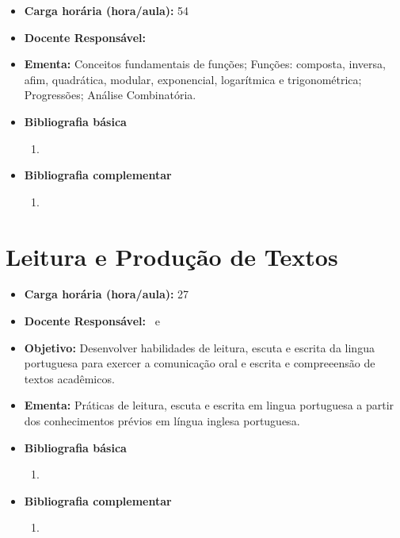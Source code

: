 \documentclass[11pt,fleqn]{book} %
\begin{document}
\begin{itemize}
	\item \textbf{Carga horária (hora/aula):} 54
	\item \textbf{Docente Responsável:}~
	\item \textbf{Ementa:} 
	Conceitos fundamentais de funções;
	Funções: composta, inversa, afim, quadrática, modular, exponencial, logarítmica e trigonométrica;
	Progressões;
	Análise Combinatória.
	\item \textbf{Bibliografia básica}
	\begin{enumerate}
		\item 
	\end{enumerate}
	\item \textbf{Bibliografia complementar}
	\begin{enumerate}
		\item 
	\end{enumerate}	
\end{itemize}


\newpage
\section{Leitura e Produção de Textos}\label{disc:leitprodtextos}

\begin{itemize}
	\item \textbf{Carga horária (hora/aula):} 27
	\item \textbf{Docente Responsável:}~ e 
	\item \textbf{Objetivo:} Desenvolver habilidades de leitura, escuta e escrita da lingua portuguesa para exercer a comunicação oral e escrita e compreeensão de textos acadêmicos.
	\item \textbf{Ementa:} 
	Práticas de leitura, escuta e escrita em lingua portuguesa a partir dos conhecimentos prévios em língua inglesa	portuguesa.
	\item \textbf{Bibliografia básica}
	\begin{enumerate}
		\item 
	\end{enumerate}
	\item \textbf{Bibliografia complementar}
	\begin{enumerate}
		\item 
	\end{enumerate}	
\end{itemize}
\end{document}
